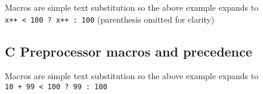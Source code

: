 Macros are simple text substitution so the above example expands to
\texttt{x++\ \textless{}\ 100\ ?\ x++\ :\ 100} (parenthesis omitted for
clarity)

\subsection{C Preprocessor macros and
precedence}\label{c-preprocessor-macros-and-precedence}

\begin{Shaded}
\begin{Highlighting}[]
 \NormalTok{;}
  \NormalTok{, }\NormalTok{); }
\end{Highlighting}
\end{Shaded}

Macros are simple text substitution so the above example expands to
\texttt{10\ +\ 99\ \textless{}\ 100\ ?\ 99\ :\ 100}
